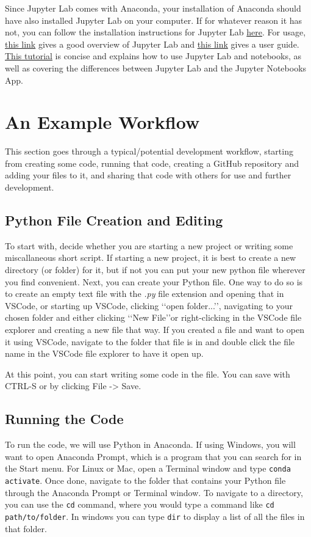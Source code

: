 \documentclass[letterpaper, 12pt]{article}
\begin{document}
Since Jupyter Lab comes with Anaconda, your installation of Anaconda should have also installed Jupyter Lab on your computer. If for whatever reason it has not, you can follow the installation instructions for Jupyter Lab \href{https://jupyterlab.readthedocs.io/en/stable/getting_started/installation.html}{here}. For usage, \href{https://jupyterlab.readthedocs.io/en/stable/getting_started/overview.html}{this link} gives a good overview of Jupyter Lab and \href{https://jupyterlab.readthedocs.io/en/stable/user/interface.html}{this link} gives a user guide. \href{https://ipython-books.github.io/36-introducing-jupyterlab/}{This tutorial} is concise and explains how to use Jupyter Lab and notebooks, as well as covering the differences between Jupyter Lab and the Jupyter Notebooks App.

\section{An Example Workflow}
This section goes through a typical/potential development workflow, starting from creating some code, running that code, creating a GitHub repository and adding your files to it, and sharing that code with others for use and further development.

\subsection{Python File Creation and Editing}
To start with, decide whether you are starting a new project or writing some miscallaneous short script. If starting a new project, it is best to create a new directory (or folder) for it, but if not you can put your new python file wherever you find convenient. Next, you can create your Python file. One way to do so is to create an empty text file with the \emph{.py} file extension and opening that in VSCode, or starting up VSCode, clicking \lq\lq open folder...\rq\rq, navigating to your chosen folder and either clicking \lq\lq New File\rq\rq or right-clicking in the VSCode file explorer and creating a new file that way. If you created a file and want to open it using VSCode, navigate to the folder that file is in and double click the file name in the VSCode file explorer to have it open up.

At this point, you can start writing some code in the file. You can save with CTRL-S or by clicking File -> Save.

\subsection{Running the Code}
To run the code, we will use Python in Anaconda. If using Windows, you will want to open Anaconda Prompt, which is a program that you can search for in the Start menu. For Linux or Mac, open a Terminal window and type \lstinline{conda activate}. Once done, navigate to the folder that contains your Python file through the Anaconda Prompt or Terminal window. To navigate to a directory, you can use the \lstinline{cd} command, where you would type a command like \lstinline{cd path/to/folder}. In windows you can type \lstinline{dir} to display a list of all the files in that folder.
\end{document}
